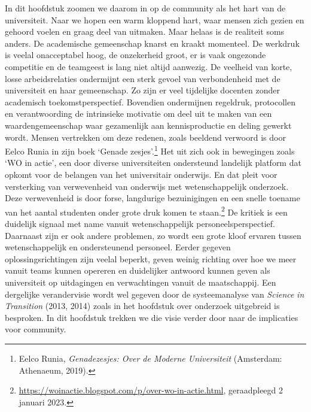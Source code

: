 \documentclass[smallauthor, chapterhaspagenum, nochapterinheader, pagenuminheader,  bigchapnum,medium2, tocpages,  garamond, titleinheader]{jote-book}
\begin{document}
	In dit hoofdstuk zoomen we daarom in op de community als het hart van de universiteit. Naar we hopen een warm kloppend hart, waar mensen zich gezien en gehoord voelen en graag deel van uitmaken. Maar helaas is de realiteit soms anders. De academische gemeenschap knarst en kraakt momenteel. De werkdruk is veelal onacceptabel hoog, de onzekerheid groot, er is vaak ongezonde competitie en de teamgeest is lang niet altijd aanwezig. De veelheid van korte, losse arbeidsrelaties ondermijnt een sterk gevoel van verbondenheid met de universiteit en haar gemeenschap. Zo zijn er veel tijdelijke docenten zonder academisch toekomstperspectief. Bovendien ondermijnen regeldruk, protocollen en verantwoording de intrinsieke motivatie om deel uit te maken van een waardengemeenschap waar gezamenlijk aan kennisproductie en deling gewerkt wordt. Mensen vertrekken om deze redenen, zoals beeldend verwoord is door Eelco Runia in zijn boek ‘Genade zesjes'.\footnote{Eelco Runia, \emph{Genadezesjes: Over de Moderne Universiteit}\emph{ }(Amsterdam: Athenaeum, 2019).} Het uit zich ook in bewegingen zoals ‘WO in actie', een door diverse universiteiten ondersteund landelijk platform dat opkomt voor de belangen van het universitair onderwijs. En dat pleit voor versterking van verwevenheid van onderwijs met wetenschappelijk onderzoek. Deze verwevenheid is door forse, langdurige bezuinigingen en een snelle toename van het aantal studenten onder grote druk komen te staan.\footnote{\href{https://woinactie.blogspot.com/p/over-wo-in-actie.html}{https://woinactie.blogspot.com/p/over-wo-in-actie.html}, geraadpleegd 2 januari 2023.} De kritiek is een duidelijk signaal met name vanuit wetenschappelijk personeelsperspectief. Daarnaast zijn er ook andere problemen, zo wordt een grote kloof ervaren tussen wetenschappelijk en ondersteunend personeel. Eerder gegeven oplossingsrichtingen zijn veelal beperkt, geven weinig richting over hoe we meer vanuit teams kunnen opereren en duidelijker antwoord kunnen geven als universiteit op uitdagingen en verwachtingen vanuit de maatschappij. Een dergelijke verandervisie wordt wel gegeven door de systeemanalyse van \emph{Science}\emph{ in }\emph{Transition} (2013, 2014) zoals in het hoofdstuk over onderzoek uitgebreid is besproken. In dit hoofdstuk trekken we die visie verder door naar de implicaties voor community.
\end{document}
